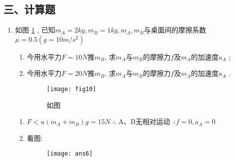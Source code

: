 \subsection*{三、计算题}
\begin{enumerate}
    \item 如图 \ref{Fig:10} , 已知$m_A=2kg, m_B=1kg, m_A, m_B$与桌面间的摩擦系数$\mu=0.5(g=10m/s^2)$
    \begin{enumerate}
    \item[(1)] 今用水平力$F=10N$推$m_B$, 求$m_A$与$m_B$的摩擦力$f$及$m_A$的加速度$a_A$ ;
    \item[(2)] 今用水平力$F=20N$推$m_B$, 求$m_A$与$m_B$的摩擦力$f$及$m_A$的加速度$a_A$ .
        \begin{figure}[h]
            \centering
            \texttt{[image: fig10]}
            \caption{如图}\label{Fig:10}
        \end{figure}
    \end{enumerate}
    \begin{solution}
        \begin{enumerate}
           \item[(1)]   $F<u(m_A+m_B)g=15N$  $\therefore$ A、B无相对运动  $\therefore f=0,a_A=0$
           \item[(2)]     看图: 
         
           \begin{figure}[H]
               \centering
               \texttt{[image: ans6]}
           \end{figure}
        \end{enumerate}
        

\end{solution}
\end{enumerate}
